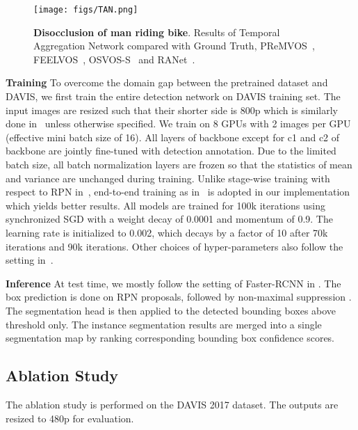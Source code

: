 \documentclass[10pt,twocolumn,letterpaper]{article}
\begin{document}
\begin{figure}[t]
\begin{center}
   \texttt{[image: figs/TAN.png]}
\end{center}
\caption{{\bf Disocclusion of man riding bike}. Results of Temporal Aggregation Network compared with Ground Truth, PReMVOS~\cite{luiten2018premvos}, FEELVOS~\cite{voigtlaender2019feelvos}, OSVOS-S~\cite{caelles2017osvos} and RANet~\cite{wang2019ranet}.}
\label{fig:tan}
\end{figure}

\textbf{Training}
To overcome the domain gap between the pretrained dataset and DAVIS, we first train the entire detection network on DAVIS training set.
The  input  images  are  resized  such  that  their  shorter  side  is  800p which is similarly done in~\cite{ren2015faster} unless otherwise specified.
We train on 8 GPUs with 2 images per GPU (effective mini batch size of 16).
All layers of backbone except for c1 and c2 of backbone are jointly fine-tuned with detection annotation.
Due to the limited batch size, all batch normalization layers are frozen so that the statistics of mean and variance are unchanged during training.
Unlike stage-wise training with respect to RPN in~\cite{he2017mask}, end-to-end  training  as in~\cite{lin2017fpn} is adopted in our implementation which yields better results.
All models are trained for 100k iterations using synchronized SGD with a weight decay of 0.0001 and momentum of 0.9.
The learning rate is initialized to 0.002, which decays by a factor of 10 after 70k iterations and 90k iterations.
Other choices of hyper-parameters also follow the setting in~\cite{ren2015faster}.

\textbf{Inference}
At test time, we mostly follow the setting of Faster-RCNN in \cite{lin2017fpn}.
The box prediction is done on RPN proposals,
followed by non-maximal suppression \cite{ross2010dpm}.
The segmentation head is then applied to the detected bounding boxes above threshold  only.
The instance segmentation results are merged into a single segmentation map by  ranking  corresponding bounding box confidence scores.

\subsection{Ablation Study}
The ablation study is performed on the DAVIS 2017 dataset.
The outputs are resized to 480p for evaluation.

\vspace{-15pt}
\end{document}
